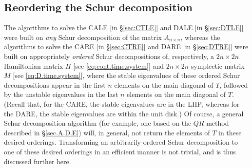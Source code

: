 \enlargethispage{7pt}
\subsection{Reordering the Schur decomposition}\label{sec:ReorderedSchur}

The algorithms to solve the CALE [in \S \ref{sec:CTLE}] and DALE [in \S \ref{sec:DTLE}] were built on {\it any} Schur decomposition of
the matrix $A_{n\times n}$, whereas the algorithms to solve the CARE [in \S \ref{sec:CTRE}] and DARE [in \S \ref{sec:DTRE}] were built on appropriately {\it ordered} Schur
decompositions of, respectively, a ${2n\times 2n}$ Hamiltonian matrix $H$ [see \eqref{eq:cont.time.system}] and ${2n\times 2n}$ symplectic matrix $M$ [see \eqref{eq:D.time.system}],
where the stable eigenvalues of these ordered Schur decompositions appear in the first $n$ elements on the main diagonal of $T$, followed by the unstable eigenvalues in the last $n$
elements on the main diagonal of $T$.  (Recall that, for the CARE, the stable eigenvalues are in the LHP, whereas for the DARE, the stable eigenvalues are within the unit disk.)
Of course, a general Schur decomposition algorithm (for example, one based on the $QR$ method described in \S \ref{sec.A.D.E})
will, in general, not return the elements of $T$ in these desired orderings.  Transforming an arbitrarily-ordered Schur decomposition
to one of these desired orderings in an efficient manner is not trivial, and is thus discussed further here.

